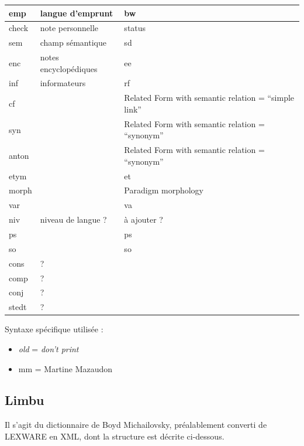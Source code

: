 \documentclass[a4paper,12pt]{article}
\begin{document}
\begin{center}
\begin{longtable}{|p{4cm}|p{5cm}|p{6cm}|}
emp & langue d’emprunt & bw \\ \hline
check & note personnelle & status \\ \hline
sem & champ sémantique & sd \\ \hline
enc & notes encyclopédiques & ee \\ \hline
inf & informateurs & rf \\ \hline
cf & & Related Form with semantic relation = ``simple link'' \\ \hline
syn & & Related Form with semantic relation = ``synonym'' \\ \hline
anton & & Related Form with semantic relation = ``synonym'' \\ \hline
etym & & et \\ \hline
morph & & Paradigm morphology \\ \hline
var & & va \\ \hline
niv & niveau de langue ? & à ajouter ? \\ \hline
ps & & ps \\ \hline
so & & so \\ \hline
cons & ? & \\ \hline
comp & ? & \\ \hline
conj & ? & \\ \hline
stedt & ? & \\ \hline
\end{longtable}
\end{center}

Syntaxe spécifique utilisée :
\begin{itemize}
\item \textit{old} = \textit{don’t print}
\item mm = Martine Mazaudon
\end{itemize}

\pagebreak

\subsection{Limbu}

Il s'agit du dictionnaire de Boyd Michailovsky, préalablement converti de LEXWARE en XML, dont la structure est décrite ci-dessous.
\end{document}
